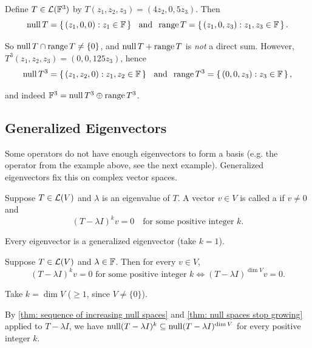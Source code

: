 \begin{example}[$\myF^3 = \mynull T^3 \oplus \myrange T^3$ for $T \in \linmap(\myF^3)$]
  Define $T \in \linmap(\myF^3)$ by $T(z_1, z_2, z_3) = (4z_2, 0, 5z_3)$. Then
  \begin{equation}
    \operatorname{null} T = \left\{ \, (z_1, 0, 0) : z_1 \in \mathbb{F} \,\right\} \;\;\, \text{and}\;\; \operatorname{range} T = \left\{ \, (z_1, 0, z_3) : z_1, z_3 \in \mathbb{F} \,\right\}.
  \end{equation}

  So $\operatorname{null} T \cap \operatorname{range} T \neq \{0\}$, and $\operatorname{null} T + \operatorname{range} T$ is \emph{not} a direct sum. However, $T^3(z_1, z_2, z_3) = (0, 0, 125 z_3)$, hence
  \begin{equation}
    \operatorname{null} T^3 = \left\{ \, (z_1, z_2, 0) : z_1, z_2 \in \mathbb{F} \,\right\} \;\;\, \text{and}\;\; \operatorname{range} T^3 = \left\{ \, (0, 0, z_3) : z_3 \in \mathbb{F} \,\right\},
  \end{equation}

  and indeed $\myF^3 = \mynull T^3 \oplus \myrange T^3$.
\end{example}

\subsection{Generalized Eigenvectors}

Some operators do not have enough eigenvectors to form a basis (e.g. the operator from the example above, see the next example). Generalized eigenvectors fix this on complex vector spaces.

\begin{mydef}
  \label{def: generalized eigenvector}
  Suppose $T \in \mathcal{L}(V)$ and $\lambda$ is an eigenvalue of $T$. A vector $v \in V$ is called a  if $v \neq 0$ and
  \begin{equation}
    (T - \lambda I)^k v = 0 \quad \text{for some positive integer } k.
  \end{equation}
\end{mydef}

Every eigenvector is a generalized eigenvector (take $k = 1$).

\begin{thm-non}
  Suppose $T \in \mathcal{L}(V)$ and $\lambda \in \mathbb{F}$. Then for every $v \in V$,
  \begin{equation}
    (T - \lambda I)^k v = 0 \text{ for some positive integer } k \iff (T - \lambda I)^{\dim V} v = 0.
  \end{equation}
\end{thm-non}
\begin{prf}
  \Leftarrowdirection Take $k = \dim V$ ($\geq 1$, since $V \neq \{0\}$).

  \Rightarrowdirection By \ref{thm: sequence of increasing null spaces} and \ref{thm: null spaces stop growing} applied to $T - \lambda I$, we have $\operatorname{null} (T - \lambda I)^k \subseteq \operatorname{null} (T - \lambda I)^{\dim V}$ for every positive integer $k$.
\end{prf}

